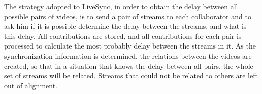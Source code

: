 The strategy adopted to LiveSync, in order to obtain the delay between all possible pairs of videos, is to send a pair of streams to each collaborator and to ask him if it is possible determine the delay between the streams, and what is this delay. All contributions are stored, and all contributions for each pair is processed to calculate the most probably delay between the streams in it. As the synchronization information is determined, the relations between the videos are created, so that in a situation that knows the delay between all pairs, the whole set of streams will be related. Streams that could not be related to others are left out of alignment.





